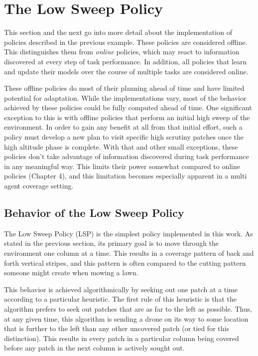 \section{The Low Sweep Policy}

This section and the next go into more detail about the implementation of policies described in the previous example. These policies are considered offline. This distinguishes them from \textit{online} policies, which may react to information discovered at every step of task performance. In addition, all policies that learn and update their models over the course of multiple tasks are considered online.

These offline policies do most of their planning ahead of time and have limited potential for adaptation. While the implementations vary, most of the behavior achieved by these policies could be fully computed ahead of time. One significant exception to this is with offline policies that perform an initial high sweep of the environment. In order to gain any benefit at all from that initial effort, such a policy must develop a new plan to visit specific high scrutiny patches once the high altitude phase is complete. With that and other small exceptions, these policies don't take advantage of information discovered during task performance in any meaningful way. This limits their power somewhat compared to online policies (Chapter 4), and this limitation becomes especially apparent in a multi agent coverage setting.

\subsection{Behavior of the Low Sweep Policy}

The Low Sweep Policy (LSP) is the simplest policy implemented in this work. As stated in the previous section, its primary goal is to move through the environment one column at a time. This results in a coverage pattern of back and forth vertical stripes, and this pattern is often compared to the cutting pattern someone might create when mowing a lawn. 

This behavior is achieved algorithmically by seeking out one patch at a time according to a particular heuristic. The first rule of this heuristic is that the algorithm prefers to seek out patches that are as far to the left as possible. Thus, at any given time, this algorithm is sending a drone on its way to some location that is further to the left than any other uncovered patch (or tied for this distinction). This results in every patch in a particular column being covered before any patch in the next column is actively sought out.

